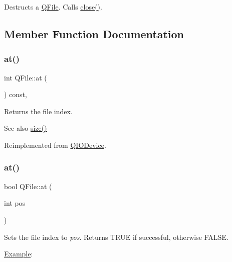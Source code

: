 Destructs a \mbox{\hyperlink{class_q_file}{Q\+File}}. Calls \mbox{\hyperlink{class_q_file_ac0d8375a5ea7d4503545d7c68dcf58e1}{close()}}. 

\subsection{Member Function Documentation}
\mbox{\label{class_q_file_aa156f3896b35b0c6f6e9cf9237bf34bf}} 
\subsubsection{\texorpdfstring{at()}{at()}\hspace{0.1cm}{\footnotesize\ttfamily [1/2]}}
{\footnotesize\ttfamily int Q\+File\+::at (\begin{DoxyParamCaption}{ }\end{DoxyParamCaption}) const\hspace{0.3cm}{\ttfamily [inline]}, {\ttfamily [virtual]}}

Returns the file index. \begin{DoxySeeAlso}{See also}
\mbox{\hyperlink{class_q_file_ae6d2d1ffc423701e6acfc7be48a11e73}{size()}} 
\end{DoxySeeAlso}


Reimplemented from \mbox{\hyperlink{class_q_i_o_device_a0dee1db4a9e506924ccac6982ffdf3df}{Q\+I\+O\+Device}}.

\mbox{\label{class_q_file_aa2f5e380a549e7d3043cf41ac8c57eba}} 
\subsubsection{\texorpdfstring{at()}{at()}\hspace{0.1cm}{\footnotesize\ttfamily [2/2]}}
{\footnotesize\ttfamily bool Q\+File\+::at (\begin{DoxyParamCaption}\item[{int}]{pos }\end{DoxyParamCaption})\hspace{0.3cm}{\ttfamily [virtual]}}

Sets the file index to {\itshape pos}. Returns T\+R\+UE if successful, otherwise F\+A\+L\+SE.

\mbox{\hyperlink{struct_example}{Example}}\+: 
\begin{DoxyCode}{0}
\end{DoxyCode}


